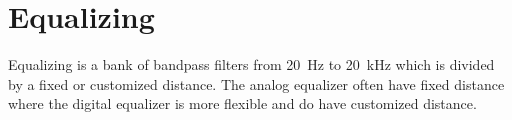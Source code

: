 \section{Equalizing}
Equalizing is a bank of bandpass filters from \SI{20}{\hertz} to \SI{20}{\kilo\hertz} which is divided by a fixed or customized distance. The analog equalizer often have fixed distance where the digital equalizer is more flexible and do have customized distance.  